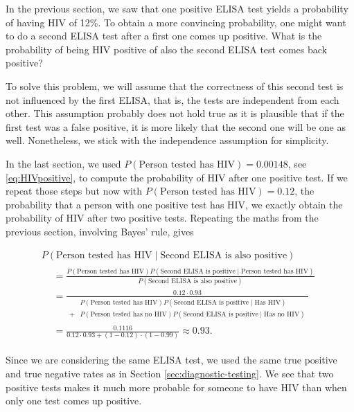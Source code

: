 \documentclass[]{book}
\theoremstyle{definition}
\theoremstyle{definition}
\theoremstyle{definition}
\theoremstyle{remark}
\begin{document}
In the previous section, we saw that one positive ELISA test yields a
probability of having HIV of 12\%. To obtain a more convincing
probability, one might want to do a second ELISA test after a first one
comes up positive. What is the probability of being HIV positive of also
the second ELISA test comes back positive?

To solve this problem, we will assume that the correctness of this
second test is not influenced by the first ELISA, that is, the tests are
independent from each other. This assumption probably does not hold true
as it is plausible that if the first test was a false positive, it is
more likely that the second one will be one as well. Nonetheless, we
stick with the independence assumption for simplicity.

In the last section, we used
\(P(\text{Person tested has HIV}) = 0.00148\), see \eqref{eq:HIVpositive},
to compute the probability of HIV after one positive test. If we repeat
those steps but now with \(P(\text{Person tested has HIV}) = 0.12\), the
probability that a person with one positive test has HIV, we exactly
obtain the probability of HIV after two positive tests. Repeating the
maths from the previous section, involving Bayes' rule, gives

\begin{multline*}
  P(\text{Person tested has HIV} \mid \text{Second ELISA is also positive}) \\
  \begin{split}
  &= \frac{P(\text{Person tested has HIV}) P(\text{Second ELISA is positive} \mid \text{Person tested has HIV})}{P(\text{Second ELISA is also positive})} \\
  &= \frac{0.12 \cdot 0.93}{
  \begin{split}
  &P(\text{Person tested has HIV}) P(\text{Second ELISA is positive} \mid \text{Has HIV}) \\
  + &P(\text{Person tested has no HIV}) P(\text{Second ELISA is positive} \mid \text{Has no HIV})
  \end{split}
  } \\
  &= \frac{0.1116}{0.12 \cdot 0.93 + (1 - 0.12)\cdot (1 - 0.99)} \approx 0.93.
  \end{split}
  \label{eq:Bayes-updating}
\end{multline*}

Since we are considering the same ELISA test, we used the same true
positive and true negative rates as in Section
\ref{sec:diagnostic-testing}. We see that two positive tests makes it
much more probable for someone to have HIV than when only one test comes
up positive.
\end{document}
